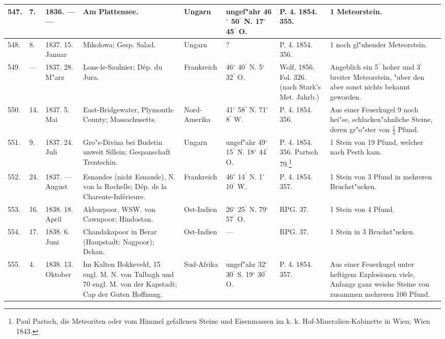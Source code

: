 \documentclass[a4paper, 8pt, oneside, polutonikogreek, german]{article}
\begin{document}
\begin{center}
\begin{longtable}{| p{5mm} | p{3mm} | p{15mm} | p{25mm} | p{20mm} | p{14mm} | p{17mm} | p{24mm} |}
        547. & 7. & 1836. --- --- & Am Plattensee. & Ungarn & ungef"ahr 46$^\circ$ 50$^\prime$ N. 17$^\circ$ 45$^\prime$ O. & P. 4. 1854. 355. & 1 Meteorstein. \\ \hline
        548. & 8. & 1837. 15. Januar & Mikolowa; Gesp. Salad. & Ungarn & ? & P. 4. 1854. 356. & 1 noch gl"uhender Meteorstein. \\ \hline
        549. & --- & 1837. 28. M"arz & Lons-le-Saulnier; Dép. du Jura. & Frankreich & 46$^\circ$ 40$^\prime$ N. 5$^\circ$ 32$^\prime$ O. & Wolf, 1856. Fol. 326. (nach Stark's Met. Jahrb.) & Angeblich ein 5$^\prime$ hoher und 3$^\prime$ breiter Meteorstein, "uber den aber sonst nichts bekannt geworden. \\ \hline
        550. & 14. & 1837. 5. Mai & East-Bridgewater, Plymouth-County; Massachusetts. & Nord-Amerika & 41$^\circ$ 58$^\prime$ N. 71$^\circ$ 8$^\prime$ W. & P. 4. 1854. 356. & Aus einer Feuerkugel 9 noch hei"se, schlacken"ahnliche Steine, deren gr"o"ster von $\frac{1}{4}$ Pfund. \\ \hline
        551. & 9. & 1837. 24. Juli & Gro"s-Divina bei Budetin unweit Sillein; Gespanschaft Trentschin. & Ungarn & ungef"ahr 49$^\circ$ 15$^\prime$ N. 18$^\circ$ 44$^\prime$ O. & P. 4. 1854. 356. Partsch 79.\footnote{Paul Partsch, die Meteoriten oder vom Himmel gefallenen Steine und Eisenmassen im k. k. Hof-Mineralien-Kabinette in Wien; Wien 1843.} & 1 Stein von 19 Pfund, welcher nach Pesth kam. \\ \hline
        552. & 24. & 1837. --- August & Esnandes (nicht Esnaude), N. von la Rochelle; Dép. de la Charente-Inférieure. & Frankreich & 46$^\circ$ 14$^\prime$ N. 1$^\circ$ 10$^\prime$ W. & P. 4. 1854. 357. & 1 Stein von 3 Pfund in mehreren Bruchst"ucken. \\ \hline
        553. & 16. & 1838. 18. April & Akburpoor, WSW. von Cawnpoor; Hindostan. & Ost-Indien & 26$^\circ$ 25$^\prime$ N. 79$^\circ$ 57$^\prime$ O. & RPG. 37. & 1 Stein von 4 Pfund. \\ \hline
        554. & 17. & 1838. 6. Juni & Chandakapoor in Berar (Haupstadt: Nagpoor); Dekan. & Ost-Indien & --- & RPG. 37. & 1 Stein in 3 Bruchst"ucken. \\ \hline
        555. & 4. & 1838. 13. Oktober & Im Kalten Bokkeveld, 15 engl. M. N. von Tulbagh und 70 engl. M. von der Kapstadt; Cap der Guten Hoffnung. & Sud-Afrika & ungef"ahr 32$^\circ$ 30$^\prime$ S. 19$^\circ$ 30$^\prime$ O. & P. 4. 1854. 357. & Aus einer Feuerkugel unter heftigem Explosionen viele, Anfangs ganz weiche Steine von zusammen mehreren 100 Pfund. \\ \hline

\end{longtable}
\end{center}
\end{document}
